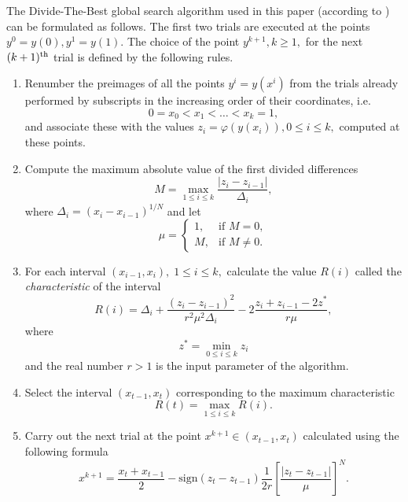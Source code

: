 \documentclass[runningheads]{llncs}
\begin{document}
The Divide-The-Best global search algorithm used in this paper (according to \cite{Strongin2000}) can be formulated as follows.
The first two trials are executed at 
the points $y^0=y(0), y^1=y(1)$. The choice of the point $y^{k+1},k\geq 1,$  
for the next $(k+1)^{\rm th}$ trial is defined by the following rules.

\begin{enumerate}
	\item 
	Renumber the preimages of all the points $y^i=y(x^i)$
	from the trials already performed  	
by subscripts in the increasing order of their coordinates, i.e.
\begin{equation}\label{x_i}
0=x_0<x_1<\dots <x_k=1,
\end{equation}
and associate these with the values $z_i=\varphi(y(x_i)), 0\leq i \leq k,$ 
computed at these points.
\item
Compute the maximum absolute value of the first divided differences
\[
M = \max_{1 \leq i \leq k}\frac{\left|z_i-z_{i-1}\right|}{\Delta_i},
\]
where $\Delta_i=\left(x_i-x_{i-1}\right)^{1/N}$ and let
\begin{equation}\label{mu}
\mu = \left\{
   \begin{array}{lr}
     1, &\textrm{if } M = 0,\\
     M, &\textrm{if } M \neq 0.
   \end{array}
\right.
\end{equation}

\item
For each interval $(x_{i-1}, x_i), \; 1\leq i \leq k,$  calculate the value 
$R(i)$ called the \textit{characteristic} of the interval
\begin{equation}\label{R}
R(i)=\Delta_i+\frac{(z_i-z_{i-1})^2}{r^2\mu^2\Delta_i}-2\frac{z_i+z_{i-1}-2z^*}{r\mu},
\end{equation}
where 
\begin{equation}\label{z}
z^*= \min_{0\leq i\leq k}z_i
\end{equation} 
and the real number $r>1$ is 
the input parameter of the algorithm.
\item 
Select the interval $(x_{t-1},x_t)$ corresponding to the maximum characteristic
\begin{equation}\label{MaxR}
R(t)= \max_{1 \leq i \leq k}R(i).
\end{equation}
\item
Carry out the next trial at the point $x^{k+1}\in(x_{t-1},x_t)$ calculated using
the following formula
\begin{equation}\label{xk1}
x^{k+1} = \frac{x_t+x_{t-1}}{2} - \mathrm{sign}(z_t-z_{t-1})\frac{1}{2r}
\left[\frac{\left|z_t-z_{t-1}\right|}{\mu}\right]^N.
\end{equation}
\end{enumerate}
\end{document}
